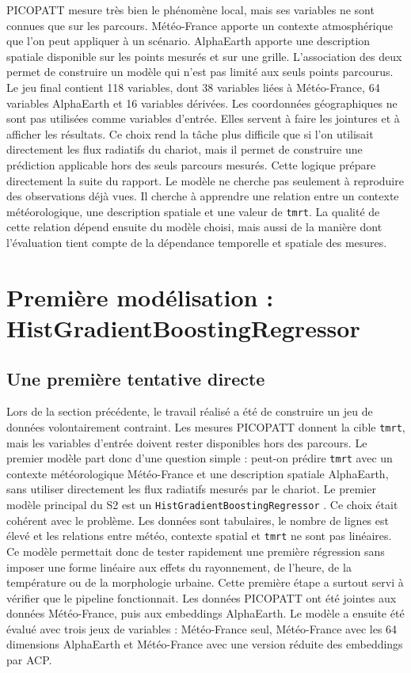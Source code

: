\documentclass{article}
\begin{document}
PICOPATT mesure très bien le phénomène local, mais ses variables ne sont connues que sur les parcours. Météo-France apporte un contexte atmosphérique que l'on peut appliquer à un scénario. AlphaEarth apporte une description spatiale disponible sur les points mesurés et sur une grille. L'association des deux permet de construire un modèle qui n'est pas limité aux seuls points parcourus.
Le jeu final contient 118 variables, dont 38 variables liées à Météo-France, 64 variables AlphaEarth et 16 variables dérivées. Les coordonnées géographiques ne sont pas utilisées comme variables d'entrée. Elles servent à faire les jointures et à afficher les résultats. Ce choix rend la tâche plus difficile que si l'on utilisait directement les flux radiatifs du chariot, mais il permet de construire une prédiction applicable hors des seuls parcours mesurés.
Cette logique prépare directement la suite du rapport. Le modèle ne cherche pas seulement à reproduire des observations déjà vues. Il cherche à apprendre une relation entre un contexte météorologique, une description spatiale et une valeur de \texttt{tmrt}. La qualité de cette relation dépend ensuite du modèle choisi, mais aussi de la manière dont l'évaluation tient compte de la dépendance temporelle et spatiale des mesures.

\newpage

\section{Première modélisation : HistGradientBoostingRegressor}

\subsection{Une première tentative directe}

Lors de la section précédente, le travail réalisé a été de construire un jeu de données volontairement contraint. Les mesures PICOPATT donnent la cible \texttt{tmrt}, mais les variables d'entrée doivent rester disponibles hors des parcours. Le premier modèle part donc d'une question simple : peut-on prédire \texttt{tmrt} avec un contexte météorologique Météo-France et une description spatiale AlphaEarth, sans utiliser directement les flux radiatifs mesurés par le chariot.
Le premier modèle principal du S2 est un \texttt{HistGradientBoostingRegressor} \cite{scikit-hist-gradient-boosting}. Ce choix était cohérent avec le problème. Les données sont tabulaires, le nombre de lignes est élevé et les relations entre météo, contexte spatial et \texttt{tmrt} ne sont pas linéaires. Ce modèle permettait donc de tester rapidement une première régression sans imposer une forme linéaire aux effets du rayonnement, de l'heure, de la température ou de la morphologie urbaine.
Cette première étape a surtout servi à vérifier que le pipeline fonctionnait. Les données PICOPATT ont été jointes aux données Météo-France, puis aux embeddings AlphaEarth. Le modèle a ensuite été évalué avec trois jeux de variables : Météo-France seul, Météo-France avec les 64 dimensions AlphaEarth et Météo-France avec une version réduite des embeddings par ACP.
\end{document}
